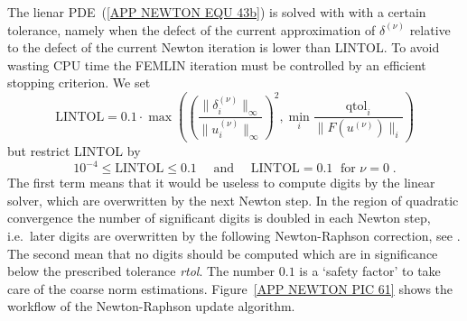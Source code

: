 The lienar PDE~(\ref{APP NEWTON EQU 43b}) is solved with with a certain tolerance, namely when
the defect of the current
approximation of $\delta^{(\nu)}$ relative to the defect of
the current Newton iteration is lower than {LINTOL}.  To avoid
wasting CPU time the FEMLIN iteration must be controlled by an
efficient stopping criterion.  We set
\begin{equation}
  \mbox{LINTOL} = 0.1 \cdot \max ( \left( \frac{\|\delta^{(\nu)}_i\|_{\infty}}{\|u_i^{(\nu)}\|_{\infty}} \right)^2 
,\min_{i} \frac{\mbox{qtol}_i}{\|F(u^{(\nu)})\|_{i}} )
\end{equation}
but restrict {LINTOL} by
\begin{equation}
       10^{-4} \le \mbox{LINTOL} \le 0.1 \quad \mbox{ and } \quad
             \mbox{LINTOL}=0.1 \; \mbox{ for }\nu=0  \;.
\end{equation}
The first term means that it would be useless to compute digits by the
linear solver, which are overwritten by the next Newton step.  In the
region of quadratic convergence the number of significant digits is
doubled in each Newton step, i.e.~later digits are overwritten by the
following Newton-Raphson correction, see \cite{Schoenauer1981a}.  The second 
mean that no digits should be computed which are in significance
below the prescribed tolerance {\it rtol}.  The number $0.1$ is a `safety factor' to take care
of the coarse norm estimations. Figure~\ref{APP NEWTON PIC 61} shows the workflow of
the Newton-Raphson update algorithm.


